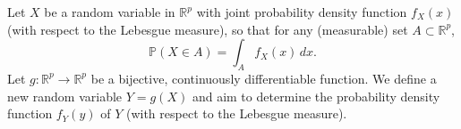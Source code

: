 \documentclass{article}
\begin{document}









Let \( X \) be a random variable in \( \mathbb{R}^p \) with joint probability density function \( f_X(x) \) (with respect to the Lebesgue measure), so that for any (measurable) set \( A \subset \mathbb{R}^p \),
\[
\mathbb{P}(X \in A) = \int_A f_X(x) \, dx.
\]
Let \( g: \mathbb{R}^p \rightarrow \mathbb{R}^p \) be a bijective, continuously differentiable function. We define a new random variable \( Y = g(X) \) and aim to determine the probability density function \( f_Y(y) \) of \( Y \) (with respect to the Lebesgue measure).
\end{document}
